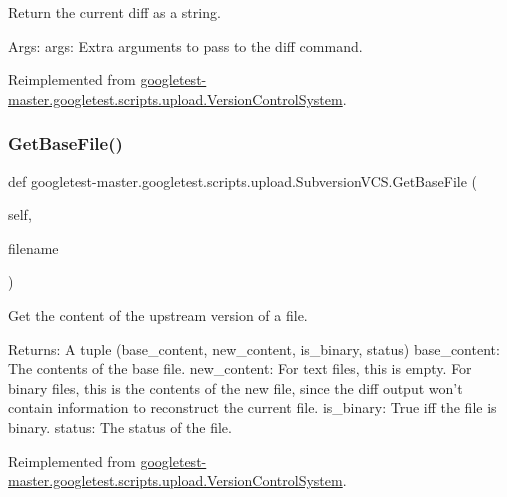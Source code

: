 \begin{DoxyVerb}Return the current diff as a string.

Args:
  args: Extra arguments to pass to the diff command.
\end{DoxyVerb}
 

Reimplemented from \mbox{\hyperlink{classgoogletest-master_1_1googletest_1_1scripts_1_1upload_1_1_version_control_system_a655beae832bab0a437542ee635477485}{googletest-\/master.\+googletest.\+scripts.\+upload.\+Version\+Control\+System}}.

\mbox{\label{classgoogletest-master_1_1googletest_1_1scripts_1_1upload_1_1_subversion_v_c_s_a6374a566b05895b119efb904440d65f6}} 
\subsubsection{\texorpdfstring{GetBaseFile()}{GetBaseFile()}}
{\footnotesize\ttfamily def googletest-\/master.\+googletest.\+scripts.\+upload.\+Subversion\+V\+C\+S.\+Get\+Base\+File (\begin{DoxyParamCaption}\item[{}]{self,  }\item[{}]{filename }\end{DoxyParamCaption})}

\begin{DoxyVerb}Get the content of the upstream version of a file.

Returns:
  A tuple (base_content, new_content, is_binary, status)
base_content: The contents of the base file.
new_content: For text files, this is empty.  For binary files, this is
  the contents of the new file, since the diff output won't contain
  information to reconstruct the current file.
is_binary: True iff the file is binary.
status: The status of the file.
\end{DoxyVerb}
 

Reimplemented from \mbox{\hyperlink{classgoogletest-master_1_1googletest_1_1scripts_1_1upload_1_1_version_control_system_adfc913d49e48291939a9de8476a4c993}{googletest-\/master.\+googletest.\+scripts.\+upload.\+Version\+Control\+System}}.

